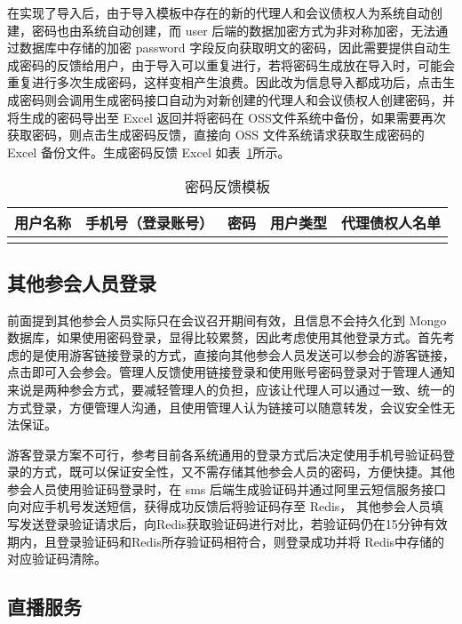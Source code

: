 在实现了导入后，由于导入模板中存在的新的代理人和会议债权人为系统自动创建，密码也由系统自动创建，而 user 后端的数据加密方式为非对称加密，无法通过数据库中存储的加密 password 字段反向获取明文的密码，因此需要提供自动生成密码的反馈给用户，由于导入可以重复进行，若将密码生成放在导入时，可能会重复进行多次生成密码，这样变相产生浪费。因此改为信息导入都成功后，点击生成密码则会调用生成密码接口自动为对新创建的代理人和会议债权人创建密码，并将生成的密码导出至 Excel 返回并将密码在 OSS文件系统中备份，如果需要再次获取密码，则点击生成密码反馈，直接向 OSS 文件系统请求获取生成密码的 Excel 备份文件。生成密码反馈 Excel 如表~\ref{fig:passwordReturn}所示。

\begin{table}[h!]
    \begin{center}
      \caption{密码反馈模板}
      \label{fig:passwordReturn}
      \begin{tabular}{ c c c c c }
        \hline
       \textbf{用户名称} & \textbf{手机号（登录账号）} & \textbf{密码} & \textbf{用户类型} & \textbf{代理债权人名单} \\
       \hline
       \\
       \hline
      \end{tabular}
    \end{center}
  \end{table}

  \subsection{其他参会人员登录}
  前面提到其他参会人员实际只在会议召开期间有效，且信息不会持久化到 Mongo 数据库，如果使用密码登录，显得比较累赘，因此考虑使用其他登录方式。首先考虑的是使用游客链接登录的方式，直接向其他参会人员发送可以参会的游客链接，点击即可入会参会。管理人反馈使用链接登录和使用账号密码登录对于管理人通知来说是两种参会方式，要减轻管理人的负担，应该让代理人可以通过一致、统一的方式登录，方便管理人沟通，且使用管理人认为链接可以随意转发，会议安全性无法保证。

  游客登录方案不可行，参考目前各系统通用的登录方式后决定使用手机号验证码登录的方式，既可以保证安全性，又不需存储其他参会人员的密码，方便快捷。其他参会人员使用验证码登录时，在 sms 后端生成验证码并通过阿里云短信服务接口向对应手机号发送短信，获得成功反馈后将验证码存至 Redis， 其他参会人员填写发送登录验证请求后，向Redis获取验证码进行对比，若验证码仍在15分钟有效期内，且登录验证码和Redis所存验证码相符合，则登录成功并将 Redis中存储的对应验证码清除。

  \subsection{直播服务}

